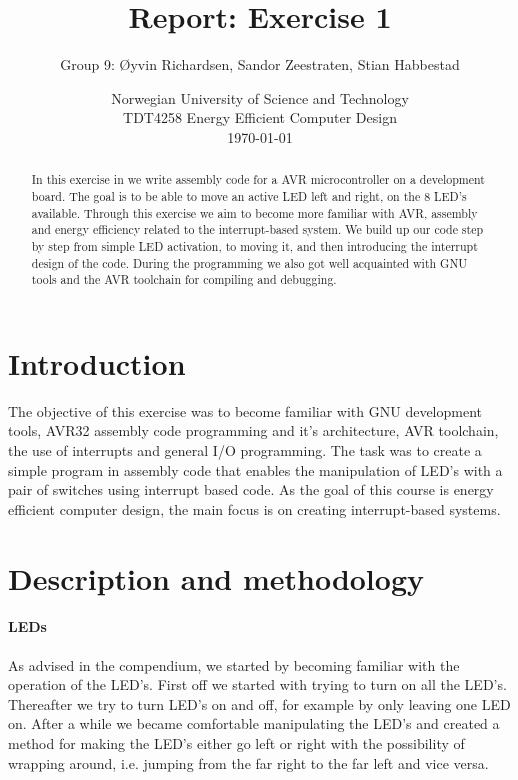 \documentclass[a4paper,11pt]{article}
\title{\textbf{Report: Exercise 1}}
\author{Group 9: \O yvin Richardsen, Sandor Zeestraten, Stian Habbestad}
\date{{Norwegian University of Science and Technology \\
TDT4258 Energy Efficient Computer Design \\}
\today}
\begin{document}
\maketitle

\begin{abstract}
In this exercise in we write assembly code for a AVR microcontroller on a development board. The goal is to be able to move an active LED left and right, on the 8 LED's available. Through this exercise we aim to become more familiar with AVR, assembly and energy efficiency related to the interrupt-based system. We build up our code step by step from simple LED activation, to moving it, and then introducing the interrupt design of the code. During the programming we also got well acquainted with GNU tools and the AVR toolchain for compiling and debugging.
\end{abstract}

\tableofcontents
\newpage

\section{Introduction}
The objective of this exercise was to become familiar with GNU development tools, AVR32 assembly code programming and it’s architecture, AVR toolchain, the use of interrupts and general I/O programming. The task was to create a simple program in assembly code that enables the manipulation of LED’s with a pair of switches using interrupt based code. As the goal of this course is energy efficient computer design, the main focus is on creating interrupt-based systems. 

\section{Description and methodology}
\paragraph{LEDs}
As advised in the compendium, we started by becoming familiar with the operation of the LED's. First off we started with trying to turn on all the LED’s. Thereafter we try to turn LED’s on and off, for example by only leaving one LED on. After a while we became comfortable manipulating the LED's and created a method for making the LED's either go left or right with the possibility of wrapping around, i.e. jumping from the far right to the far left and vice versa.
\end{document}
